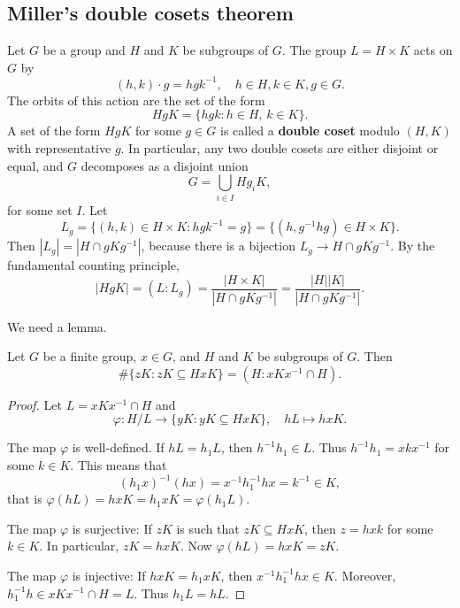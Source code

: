 


\subsection{Miller's double cosets theorem}

Let $G$ be a group and $H$ and $K$ be subgroups of $G$. 
The group $L=H\times K$ acts on $G$ by
\[
(h,k)\cdot g=hgk^{-1},\quad h\in H,k\in K,g\in G.
\]
The orbits of this action are the set of the form 
\[
HgK=\{hgk:h\in H,\,k\in K\}.
\]
A set of the form $HgK$ for some $g\in G$ is called a \textbf{double coset} modulo $(H,K)$ 
with representative $g$. In particular, 
any two double cosets are either disjoint or equal, and $G$ decomposes
as a disjoint union 
\[
G=\bigcup_{i\in I}Hg_iK,
\]
for some set $I$. Let 
\[
L_g=\{(h,k)\in H\times K:hgk^{-1}=g\}=\{(h,g^{-1}hg)\in H\times K\}.
\]
Then
$|L_g|=|H\cap gKg^{-1}|$, 
because there is a bijection $L_g\to H\cap gKg^{-1}$.  
By the fundamental counting principle, 
\[
|HgK|=(L:L_g)=\frac{|H\times K|}{|H\cap gKg^{-1}|}=\frac{|H||K|}{|H\cap gKg^{-1}|}.
\]

We need a lemma. 

\begin{lemma}
\label{lem:Miller}
    Let $G$ be a finite group, $x\in G$, and $H$ and $K$ be subgroups of $G$. Then
    \[
    \#\{zK:zK\subseteq HxK\}=(H:xKx^{-1}\cap H).
    \]
\end{lemma}

\begin{proof}
    Let $L=xKx^{-1}\cap H$ and 
    \[
    \varphi\colon H/L\to\{yK:yK\subseteq HxK\},\quad 
    hL\mapsto hxK.
    \]

    The map $\varphi$ is well-defined. If $hL=h_1L$, then $h^{-1}h_1\in L$. Thus 
    $h^{-1}h_1=xkx^{-1}$ for some $k\in K$. This means that
    \[
    (h_1x)^{-1}(hx)=x^{-1}h_1^{-1}hx=k^{-1}\in K,
    \]
    that is $\varphi(hL)=hxK=h_1xK=\varphi(h_1L)$. 

    The map $\varphi$ is surjective: If $zK$ is such that $zK\subseteq HxK$, then 
    $z=hxk$ for some $k\in K$. In particular, 
    $zK=hxK$. Now $\varphi(hL)=hxK=zK$.

    The map $\varphi$ is injective: If $hxK=h_1xK$, then 
    $x^{-1}h_1^{-1}hx\in K$. Moreover, 
    $h_1^{-1}h\in xKx^{-1}\cap H=L$. Thus $h_1L=hL$. 
\end{proof}


